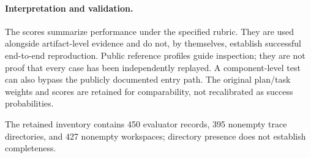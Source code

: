 


\paragraph{Interpretation and validation.}
The scores summarize performance under the specified rubric. They are used alongside artifact-level evidence and do not, by themselves, establish successful end-to-end reproduction. Public reference profiles guide inspection; they are not proof that every case has been independently replayed. A component-level test can also bypass the publicly documented entry path. The original plan/task weights and scores are retained for comparability, not recalibrated as success probabilities.

The retained inventory contains 450 evaluator records, 395 nonempty trace directories, and 427 nonempty workspaces; directory presence does not establish completeness. 
